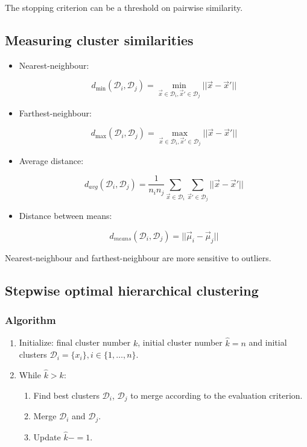 		The stopping criterion can be a threshold on pairwise similarity.

	\subsection{Measuring cluster similarities}

	\begin{itemize}
		\item Nearest-neighbour:

			$$d_{\min}(\mathcal{D}_i,\mathcal{D}_j) = \min\limits_{\vec{x}\in\mathcal{D}_i,\vec{x}'\in\mathcal{D}_j} ||\vec{x}-\vec{x}'||$$

		\item Farthest-neighbour:

			$$d_{\max}(\mathcal{D}_i,\mathcal{D}_j) = \max\limits_{\vec{x}\in\mathcal{D}_i,\vec{x}'\in\mathcal{D}_j} ||\vec{x}-\vec{x}'||$$

		\item Average distance:

			$$d_{avg}(\mathcal{D}_i,\mathcal{D}_j) = \frac{1}{n_in_j}\sum\limits_{\vec{x}\in\mathcal{D}_i}\sum\limits_{\vec{x}'\in\mathcal{D}_j} ||\vec{x}-\vec{x}'||$$

		\item Distance between means:

			$$d_{means}(\mathcal{D}_i,\mathcal{D}_j) = ||\vec{\mu}_i-\vec{\mu}_j||$$

	\end{itemize}

	Nearest-neighbour and farthest-neighbour are more sensitive to outliers.



	\subsection{Stepwise optimal hierarchical clustering}

		\subsubsection{Algorithm}

		\begin{enumerate}
			\item Initialize: final cluster number $k$, initial cluster number $\hat{k} = n$ and initial clusters $\mathcal{D}_i = \{x_i\},i\in\{1,\dots,n\}$.
			\item While $\hat{k}> k$:

				\begin{enumerate}
					\item Find best clusters $\mathcal{D}_i$, $\mathcal{D}_j$ to merge according to the evaluation criterion.
					\item Merge $\mathcal{D}_i$ and $\mathcal{D}_j$.
					\item Update $\hat{k} -= 1$.
				\end{enumerate}

		\end{enumerate}
		


